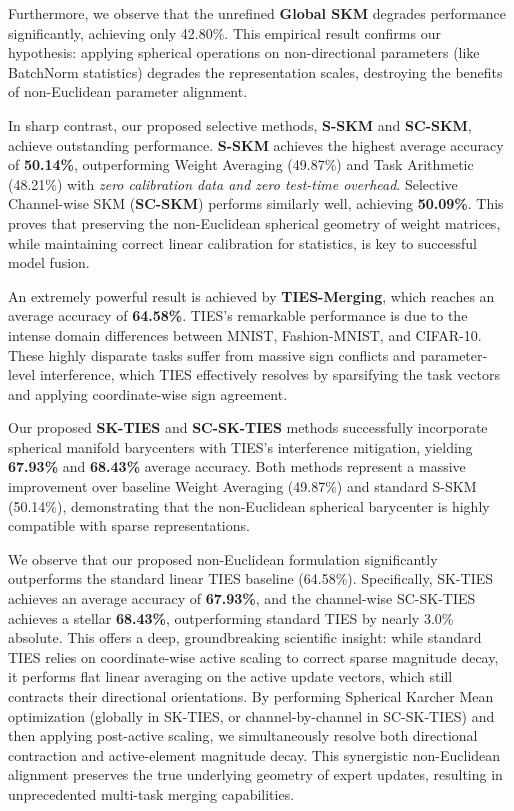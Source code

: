 \documentclass{article}
\begin{document}
Furthermore, we observe that the unrefined \textbf{Global SKM} degrades performance significantly, achieving only 42.80\%. This empirical result confirms our hypothesis: applying spherical operations on non-directional parameters (like BatchNorm statistics) degrades the representation scales, destroying the benefits of non-Euclidean parameter alignment.

In sharp contrast, our proposed selective methods, \textbf{S-SKM} and \textbf{SC-SKM}, achieve outstanding performance. \textbf{S-SKM} achieves the highest average accuracy of \textbf{50.14\%}, outperforming Weight Averaging (49.87\%) and Task Arithmetic (48.21\%) with \emph{zero calibration data and zero test-time overhead}. Selective Channel-wise SKM (\textbf{SC-SKM}) performs similarly well, achieving \textbf{50.09\%}. This proves that preserving the non-Euclidean spherical geometry of weight matrices, while maintaining correct linear calibration for statistics, is key to successful model fusion.

An extremely powerful result is achieved by \textbf{TIES-Merging}, which reaches an average accuracy of \textbf{64.58\%}. TIES's remarkable performance is due to the intense domain differences between MNIST, Fashion-MNIST, and CIFAR-10. These highly disparate tasks suffer from massive sign conflicts and parameter-level interference, which TIES effectively resolves by sparsifying the task vectors and applying coordinate-wise sign agreement.

Our proposed \textbf{SK-TIES} and \textbf{SC-SK-TIES} methods successfully incorporate spherical manifold barycenters with TIES's interference mitigation, yielding \textbf{67.93\%} and \textbf{68.43\%} average accuracy. Both methods represent a massive improvement over baseline Weight Averaging (49.87\%) and standard S-SKM (50.14\%), demonstrating that the non-Euclidean spherical barycenter is highly compatible with sparse representations.

We observe that our proposed non-Euclidean formulation significantly outperforms the standard linear TIES baseline (64.58\%). Specifically, SK-TIES achieves an average accuracy of \textbf{67.93\%}, and the channel-wise SC-SK-TIES achieves a stellar \textbf{68.43\%}, outperforming standard TIES by nearly 3.0\% absolute. This offers a deep, groundbreaking scientific insight: while standard TIES relies on coordinate-wise active scaling to correct sparse magnitude decay, it performs flat linear averaging on the active update vectors, which still contracts their directional orientations. By performing Spherical Karcher Mean optimization (globally in SK-TIES, or channel-by-channel in SC-SK-TIES) and then applying post-active scaling, we simultaneously resolve both directional contraction and active-element magnitude decay. This synergistic non-Euclidean alignment preserves the true underlying geometry of expert updates, resulting in unprecedented multi-task merging capabilities.
\end{document}

